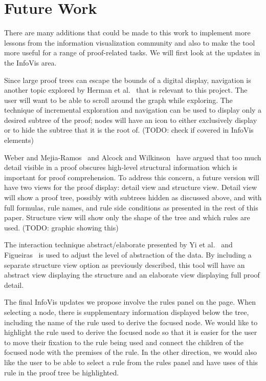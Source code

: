 \documentclass[conference]{IEEEtran}
\begin{document}
\section{Future Work}
\label{sec:future}

There are many additions that could be made to this work to implement more lessons from the information visualization community and also to make the tool more useful for a range of proof-related tasks. We will first look at the updates in the InfoVis area.

Since large proof trees can escape the bounds of a digital display, navigation is another topic explored by Herman et al.~\cite{graphvis-herman+melancon+marshall} that is relevant to this project. The user will want to be able to scroll around the graph while exploring. The technique of incremental exploration and navigation can be used to display only a desired subtree of the proof; nodes will have an icon to either exclusively display or to hide the subtree that it is the root of. (TODO: check if covered in InfoVis elements)

Weber and Mejia-Ramos~\cite{majorsbeliefs-weber+mejiaramos} and Alcock and Wilkinson~\cite{eproofs-alcock+wilkinson} have argued that too much detail visible in a proof obscures high-level structural information which is important for proof comprehension. To address this concern, a future version will have two views for the proof display: detail view and structure view. Detail view will show a proof tree, possibly with subtrees hidden as discussed above, and with full formulas, rule names, and rule side conditions as presented in the rest of this paper. Structure view will show only the shape of the tree and which rules are used. (TODO: graphic showing this)

The interaction technique abstract/elaborate presented by Yi et al.~\cite{interaction-yietal} and Figueiras~\cite{interaction-figueiras} is used to adjust the level of abstraction of the data. By including a separate structure view option as previously described, this tool will have an abstract view displaying the structure and an elaborate view displaying full proof detail.

The final InfoVis updates we propose involve the rules panel on the page. When selecting a node, there is supplementary information displayed below the tree, including the name of the rule used to derive the focused node. We would like to highlight the rule used to derive the focused node so that it is easier for the user to move their fixation to the rule being used and connect the children of the focused node with the premises of the rule. In the other direction, we would also like the user to be able to select a rule from the rules panel and have uses of this rule in the proof tree be highlighted.%
\end{document}
